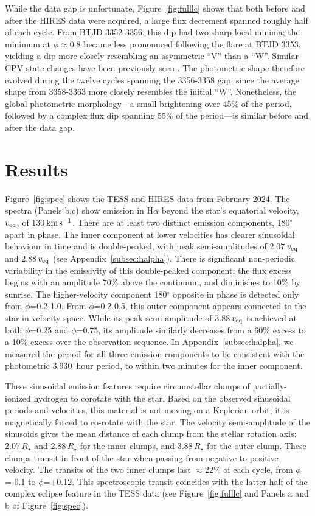 \documentclass[11pt,twocolumn,tighten]{aastex7}
\newcommand{\kms}{\ensuremath{\rm km\,s^{-1}}}
\newcommand{\periodhr}{3.930}
\begin{document}
While the data gap is unfortunate, Figure~\ref{fig:fulllc} shows that
both before and after the HIRES data were acquired, a large flux
decrement spanned roughly half of each cycle.  From BTJD 3352-3356,
this dip had two sharp local minima;  the minimum at
$\phi$$\approx$0.8 became less pronounced following the flare at BTJD
3353, yielding a dip more closely resembling an asymmetric ``V'' than
a ``W''.  Similar CPV state changes have been previously seen
\citep{Stauffer2017,Bouma2024}.  The photometric shape therefore
evolved during the twelve cycles spanning the 3356-3358 gap, since the
average shape from 3358-3363 more closely resembles the initial ``W''.
Nonetheless, the global photometric morphology---a small brightening
over 45\% of the period, followed by a complex flux dip spanning 55\%
of the period---is similar before and after the data gap.


\section{Results}
\label{sec:results}

Figure~\ref{fig:spec} shows the TESS and HIRES data from February
2024.  The spectra (Panels b,c) show emission in H$\alpha$
beyond the star's equatorial velocity, $v_{\rm eq}$, of 130\,\kms.
There are at least two distinct emission components, 180$^\circ$ apart
in phase.  The inner component at lower velocities has clearer
sinusoidal behaviour in time and is double-peaked, with peak
semi-amplitudes of 2.07\,$v_{\rm eq}$ and 2.88\,$v_{\rm eq}$ (see
Appendix~\ref{subsec:halpha}).  There is significant non-periodic
variability in the emissivity of this double-peaked component: the
flux excess begins with an amplitude 70\% above the continuum, and
diminishes to 10\% by sunrise.  The higher-velocity component
180$^\circ$ opposite in phase is detected only from $\phi$=0.2-1.0.
From $\phi$=0.2-0.5, this outer component appears connected to the
star in velocity space.  While its peak semi-amplitude of
3.88\,$v_{\rm eq}$ is achieved at both $\phi$=0.25 and $\phi$=0.75,
its amplitude similarly decreases from a 60\% excess to a 10\% excess
over the observation sequence.  In Appendix~\ref{subsec:halpha}, we
measured the period for all three emission components to be consistent
with the photometric \periodhr\ hour period, to within two minutes for
the inner component.  

These sinusoidal emission features require circumstellar clumps of
partially-ionized hydrogen to corotate with the star.  Based on the
observed sinusoidal periods and velocities, this material is
not moving on a Keplerian orbit; it is magnetically forced to
co-rotate with the star.  The velocity semi-amplitude of the
sinusoids gives the mean distance of each clump from the stellar
rotation axis: 2.07\,$R_\star$ and 2.88\,$R_\star$ for the
inner clumps, and 3.88\,$R_\star$ for the outer clump.   These clumps
transit in front of the star when passing from negative to positive
velocity.  The transits of the two inner clumps last $\approx$22\% of
each cycle, from $\phi$=-0.1 to $\phi$=+0.12.  This spectroscopic
transit coincides with the latter half of the complex eclipse feature
in the TESS data (see Figure~\ref{fig:fulllc} and Panels a and
b of Figure~\ref{fig:spec}).
\end{document}
